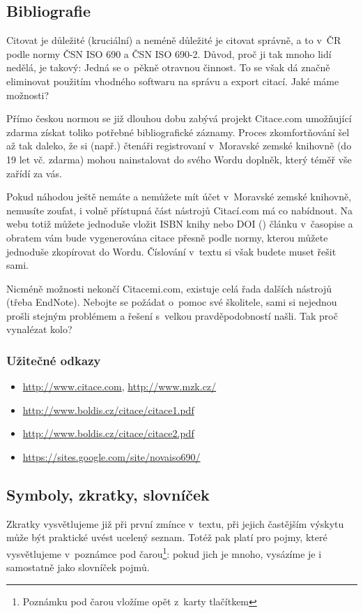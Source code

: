 \documentclass{template/socthesis}
\begin{document}
\subsection{Bibliografie}
Citovat je důležité (kruciální) a neméně důležité je citovat správně, a to v~ČR podle normy ČSN ISO 690 a ČSN ISO 690-2. Důvod, proč ji tak mnoho lidí nedělá, je takový: Jedná se o~pěkně otravnou činnost\cite{citovani}. To se však dá značně eliminovat použitím vhodného softwaru na správu a export citací. Jaké máme možnosti?

Přímo českou normou se již dlouhou dobu zabývá projekt Citace.com umožňující zdarma získat toliko potřebné bibliografické záznamy. Proces zkomfortňování šel až tak daleko, že si (např.) čtenáři registrovaní v~Moravské zemské knihovně (do 19 let vč. zdarma) mohou nainstalovat do svého Wordu doplněk, který téměř vše zařídí za vás.

Pokud náhodou ještě nemáte a nemůžete mít účet v~Moravské zemské knihovně, nemusíte zoufat, i volně přístupná část nástrojů Citací.com má co nabídnout. Na webu totiž můžete jednoduše vložit ISBN knihy nebo DOI () článku v~časopise a obratem vám bude vygenerována citace přesně podle normy, kterou můžete jednoduše zkopírovat do Wordu. Číslování v~textu si však budete muset řešit sami.

Nicméně možnosti nekončí Citacemi.com, existuje celá řada dalších nástrojů (třeba EndNote). Nebojte se požádat o~pomoc své školitele, sami si nejednou prošli stejným problémem a řešení s~velkou pravděpodobností našli. Tak proč vynalézat kolo?

\subsubsection{Užitečné odkazy}
\begin{itemize}
    \item \url{http://www.citace.com}, \url{http://www.mzk.cz/}
	\item \url{http://www.boldis.cz/citace/citace1.pdf}
	\item \url{http://www.boldis.cz/citace/citace2.pdf}
	\item \url{https://sites.google.com/site/novaiso690/}
\end{itemize}

\subsection{Symboly, zkratky, slovníček}
Zkratky vysvětlujeme již při první zmínce v~textu, při jejich častějším výskytu může být praktické uvést ucelený seznam. Totéž pak platí pro pojmy, které vysvětlujeme v~poznámce pod čarou\footnote{Poznámku pod čarou vložíme opět z~karty  tlačítkem }: pokud jich je mnoho, vysázíme je i samostatně jako slovníček pojmů.
\end{document}
